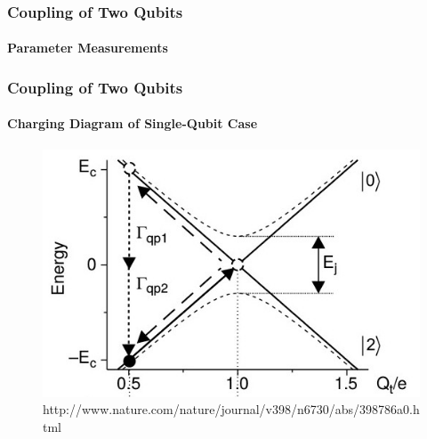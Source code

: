 \documentclass{beamer}
\begin{document}

\begin{frame}
    \frametitle{Coupling of Two Qubits}
    \framesubtitle{Parameter Measurements}
\end{frame}


\begin{frame}
    \frametitle{Coupling of Two Qubits}
    \framesubtitle{Charging Diagram of Single-Qubit Case}
    \begin{figure}[ht!]
        \centering
        \includegraphics[height=0.6\textheight]{img/single-qubit-band-diagram-only.jpg}
        \caption{http://www.nature.com/nature/journal/v398/n6730/abs/398786a0.html}
    \end{figure}
\end{frame}

\end{document}
